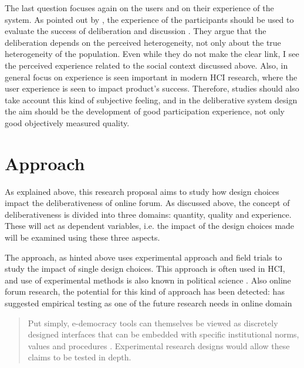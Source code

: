 \documentclass{article}
\begin{document}
The last question focuses again on the users and on their experience of the system. As pointed out by , the experience of the participants should be used to evaluate the success of deliberation and discussion . They argue that the deliberation depends on the perceived heterogeneity, not only about the true heterogeneity of the population. Even while they do not make the clear link, I see the perceived experience related to the social context discussed above. Also, in general focus on experience is seen important in modern HCI research, where the user experience is seen to impact product's success. Therefore, studies should also take account this kind of subjective feeling, and in the deliberative system design the aim should be the development of good participation experience, not only good objectively measured quality.


\section{Approach}

As explained above, this research proposal aims to study how design choices impact the deliberativeness of online forum. As discussed above, the concept of deliberativeness is divided into three domains: quantity, quality and experience. These will act as dependent variables, i.e. the impact of the design choices made will be examined using these three aspects.

The approach, as hinted above uses experimental approach and field trials to study the impact of single design choices. This approach is often used in HCI, and use of experimental methods is also known in political science \cite{brown11,green03,stoker10}. Also online forum research, the potential for this kind of approach has been detected:  has suggested empirical testing as one of the future research needs in online domain

\begin{quote}
Put simply, e-democracy tools can themselves be viewed as discretely designed interfaces that can be embedded with specific institutional norms, values and procedures \cite{wright07}. Experimental research designs would allow these claims to be tested in depth.
\end{quote}
\end{document}
